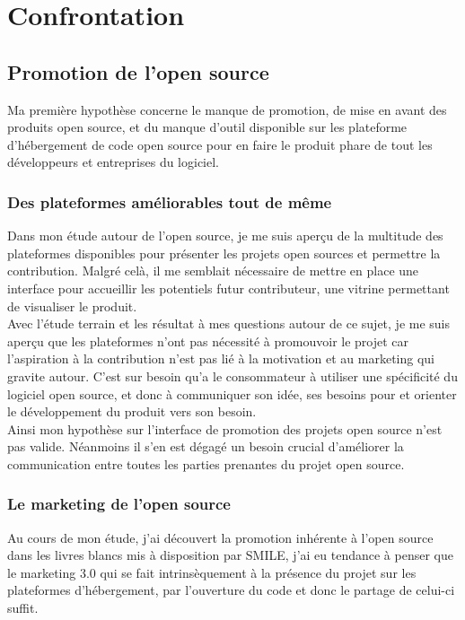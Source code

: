 \chapter{Confrontation} 

\section{Promotion de l'open source}

	Ma première hypothèse concerne le manque de promotion, de mise en avant des produits open source, et du manque d'outil disponible sur les plateforme d'hébergement de code open source pour en faire le produit phare de tout les développeurs et entreprises du logiciel.

	\subsection{Des plateformes améliorables tout de même}

		Dans mon étude autour de l'open source, je me suis aperçu de la multitude des plateformes disponibles pour présenter les projets open sources et permettre la contribution. Malgré celà, il me semblait nécessaire de mettre en place une interface pour accueillir les potentiels futur contributeur, une vitrine permettant de visualiser le produit.\\

		Avec l'étude terrain et les résultat à mes questions autour de ce sujet, je me suis aperçu que les plateformes n'ont pas nécessité à promouvoir le projet car l'aspiration à la contribution n'est pas lié à la motivation et au marketing qui gravite autour. C'est sur besoin qu'a le consommateur à utiliser une spécificité du logiciel open source, et donc à communiquer son idée, ses besoins pour  et orienter le développement du produit vers son besoin.\\

		Ainsi mon hypothèse sur l'interface de promotion des projets open source n'est pas valide.
		Néanmoins il s'en est dégagé un besoin crucial d'améliorer la communication entre toutes les parties prenantes du projet open source.

	\subsection{Le marketing de l'open source}

		Au cours de mon étude, j'ai découvert la promotion inhérente à l'open source dans les livres blancs mis à disposition par SMILE, j'ai eu tendance à penser que le marketing 3.0 qui se fait intrinsèquement à la présence du projet sur les plateformes d'hébergement, par l'ouverture du code et donc le partage de celui-ci suffit.\\

